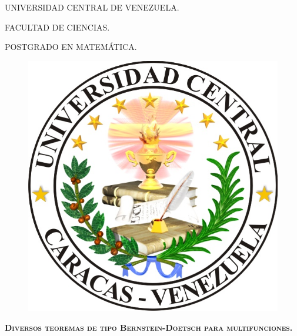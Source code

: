
\begin{titlepage}
%


\begin{center}

UNIVERSIDAD CENTRAL DE VENEZUELA.

FACULTAD DE CIENCIAS.

POSTGRADO EN MATEM\'ATICA.

\end{center}

\begin{figure}[h]
	\centering
		\includegraphics[scale=0.3]{ucv.jpg}
\end{figure}


\vspace{1cm}

\begin{large}

\begin{center}

\parbox{12cm}{
\begin{center} 
\textsc{\textbf{Diversos teoremas de tipo Bernstein-Doetsch para multifunciones.}}
\end{center}
}
\end{center}


\end{large}
\end{titlepage}
